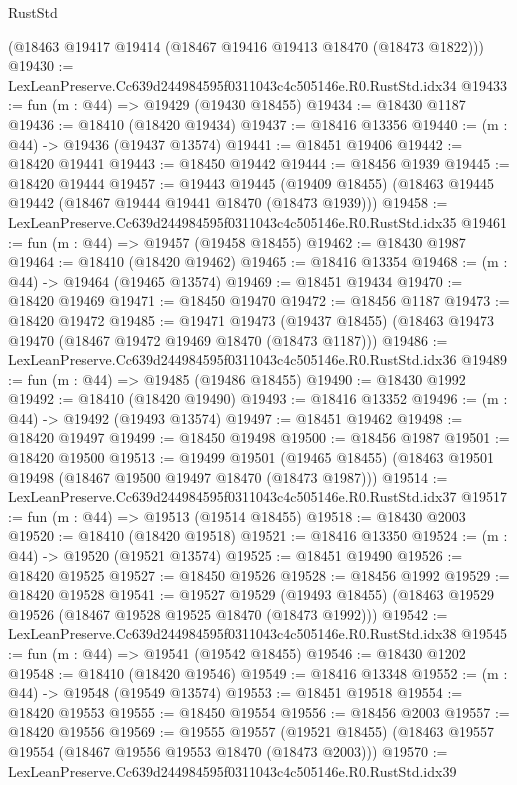 \begin{lexlean}{RustStd}
\begin{coremodule}
    (@18463 @19417 @19414 (@18467 @19416 @19413 @18470 (@18473 @1822)))
@19430 := LexLeanPreserve.Cc639d244984595f0311043c4c505146e.R0.RustStd.idx34
@19433 := fun (m : @44) => @19429 (@19430 @18455)
@19434 := @18430 @1187
@19436 := @18410 (@18420 @19434)
@19437 := @18416 @13356
@19440 := (m : @44) -> @19436 (@19437 @13574)
@19441 := @18451 @19406
@19442 := @18420 @19441
@19443 := @18450 @19442
@19444 := @18456 @1939
@19445 := @18420 @19444
@19457 := @19443
    @19445
    (@19409 @18455)
    (@18463 @19445 @19442 (@18467 @19444 @19441 @18470 (@18473 @1939)))
@19458 := LexLeanPreserve.Cc639d244984595f0311043c4c505146e.R0.RustStd.idx35
@19461 := fun (m : @44) => @19457 (@19458 @18455)
@19462 := @18430 @1987
@19464 := @18410 (@18420 @19462)
@19465 := @18416 @13354
@19468 := (m : @44) -> @19464 (@19465 @13574)
@19469 := @18451 @19434
@19470 := @18420 @19469
@19471 := @18450 @19470
@19472 := @18456 @1187
@19473 := @18420 @19472
@19485 := @19471
    @19473
    (@19437 @18455)
    (@18463 @19473 @19470 (@18467 @19472 @19469 @18470 (@18473 @1187)))
@19486 := LexLeanPreserve.Cc639d244984595f0311043c4c505146e.R0.RustStd.idx36
@19489 := fun (m : @44) => @19485 (@19486 @18455)
@19490 := @18430 @1992
@19492 := @18410 (@18420 @19490)
@19493 := @18416 @13352
@19496 := (m : @44) -> @19492 (@19493 @13574)
@19497 := @18451 @19462
@19498 := @18420 @19497
@19499 := @18450 @19498
@19500 := @18456 @1987
@19501 := @18420 @19500
@19513 := @19499
    @19501
    (@19465 @18455)
    (@18463 @19501 @19498 (@18467 @19500 @19497 @18470 (@18473 @1987)))
@19514 := LexLeanPreserve.Cc639d244984595f0311043c4c505146e.R0.RustStd.idx37
@19517 := fun (m : @44) => @19513 (@19514 @18455)
@19518 := @18430 @2003
@19520 := @18410 (@18420 @19518)
@19521 := @18416 @13350
@19524 := (m : @44) -> @19520 (@19521 @13574)
@19525 := @18451 @19490
@19526 := @18420 @19525
@19527 := @18450 @19526
@19528 := @18456 @1992
@19529 := @18420 @19528
@19541 := @19527
    @19529
    (@19493 @18455)
    (@18463 @19529 @19526 (@18467 @19528 @19525 @18470 (@18473 @1992)))
@19542 := LexLeanPreserve.Cc639d244984595f0311043c4c505146e.R0.RustStd.idx38
@19545 := fun (m : @44) => @19541 (@19542 @18455)
@19546 := @18430 @1202
@19548 := @18410 (@18420 @19546)
@19549 := @18416 @13348
@19552 := (m : @44) -> @19548 (@19549 @13574)
@19553 := @18451 @19518
@19554 := @18420 @19553
@19555 := @18450 @19554
@19556 := @18456 @2003
@19557 := @18420 @19556
@19569 := @19555
    @19557
    (@19521 @18455)
    (@18463 @19557 @19554 (@18467 @19556 @19553 @18470 (@18473 @2003)))
@19570 := LexLeanPreserve.Cc639d244984595f0311043c4c505146e.R0.RustStd.idx39

\end{coremodule}
\end{lexlean}
